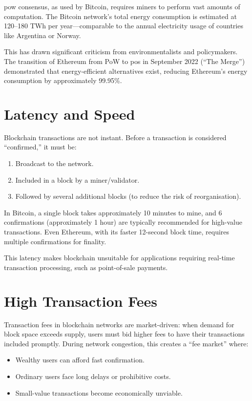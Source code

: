 \Gls{pow} consensus, as used by Bitcoin, requires miners to perform vast amounts of computation. The Bitcoin network's total energy consumption is estimated at 120--180 TWh per year---comparable to the annual electricity usage of countries like Argentina or Norway.

This has drawn significant criticism from environmentalists and policymakers. The transition of Ethereum from PoW to \gls{pos} in September 2022 (``The Merge'') demonstrated that energy-efficient alternatives exist, reducing Ethereum's energy consumption by approximately 99.95\%.

\section{Latency and Speed}
\label{sec:latency}

Blockchain transactions are not instant. Before a transaction is considered ``confirmed,'' it must be:
\begin{enumerate}
    \item Broadcast to the network.
    \item Included in a block by a miner/validator.
    \item Followed by several additional blocks (to reduce the risk of reorganisation).
\end{enumerate}

In Bitcoin, a single block takes approximately 10 minutes to mine, and 6 confirmations (approximately 1 hour) are typically recommended for high-value transactions. Even Ethereum, with its faster 12-second block time, requires multiple confirmations for finality.

This latency makes blockchain unsuitable for applications requiring real-time transaction processing, such as point-of-sale payments.

\section{High Transaction Fees}
\label{sec:fees}

Transaction fees in blockchain networks are market-driven: when demand for block space exceeds supply, users must bid higher fees to have their transactions included promptly. During network congestion, this creates a ``fee market'' where:
\begin{itemize}
    \item Wealthy users can afford fast confirmation.
    \item Ordinary users face long delays or prohibitive costs.
    \item Small-value transactions become economically unviable.
\end{itemize}


